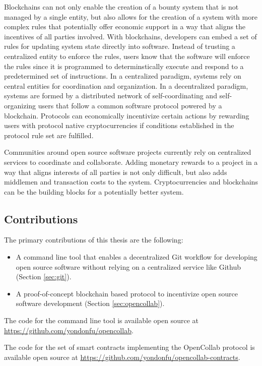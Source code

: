 Blockchains can not only enable the creation of a bounty system that is not
managed by a single entity, but also allows for the creation of a system with
more complex rules that potentially offer economic support in a way that aligns the
incentives of all parties involved. With blockchains, developers can embed a set
of rules for updating system state directly into software. Instead of trusting a
centralized entity to enforce the rules, users know that the software will
enforce the rules since it is programmed to determinstically execute and respond
to a predetermined set of instructions. In a centralized paradigm, systems rely
on central entities for coordination and organization. In a decentralized
paradigm, systems are formed by a distributed network of self-coordinating and
self-organizing users that follow a common software protocol powered by a
blockchain. Protocols can economically incentivize certain actions by rewarding
users with protocol native cryptocurrencies if conditions established in the
protocol rule set are fulfilled.

Communities around open source software projects currently rely on centralized
services to coordinate and collaborate. Adding monetary rewards to a project in
a way that aligns interests of all parties is not only difficult, but also adds
middlemen and transaction costs to the system. Cryptocurrencies and
blockchains can be the building blocks for a potentially better system.

\subsection{Contributions}

The primary contributions of this thesis are the following:

\begin{itemize}
  \item A command line tool that enables a decentralized Git workflow for
    developing open source software without relying on a centralized service
    like Github (Section \ref{sec:git}).
  \item A proof-of-concept blockchain based protocol to incentivize open source
    software development (Section \ref{sec:opencollab}).
\end{itemize}

The code for the command line tool is available open source at \url{https://github.com/yondonfu/opencollab}.

The code for the set of smart contracts implementing the OpenCollab protocol is
available open source at \url{https://github.com/yondonfu/opencollab-contracts}.

